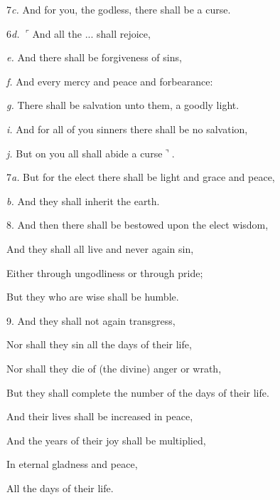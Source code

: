 7\emph{c.} And for you, the godless, there shall be a curse.

6\emph{d.} $\ulcorner$And all the ... shall rejoice,

\emph{e.} And there shall be forgiveness of sins,

\emph{f.} And every mercy and peace and forbearance:

\emph{g.} There shall be salvation unto them, a goodly light.

\emph{i.} And for all of you sinners there shall be no salvation,

\emph{j.} But on you all shall abide a curse$\urcorner$.

7\emph{a.} But for the elect there shall be light and grace and peace,

\emph{b.} And they shall inherit the earth.

8. And then there shall be bestowed upon the elect wisdom,

And they shall all live and never again sin,

Either through ungodliness or through pride;

But they who are wise shall be humble.

9. And they shall not again transgress,

Nor shall they sin all the days of their life,

Nor shall they die of (the divine) anger or wrath,

But they shall complete the number of the days of their life.

And their lives shall be increased in peace,

And the years of their joy shall be multiplied,

In eternal gladness and peace,

All the days of their life.


